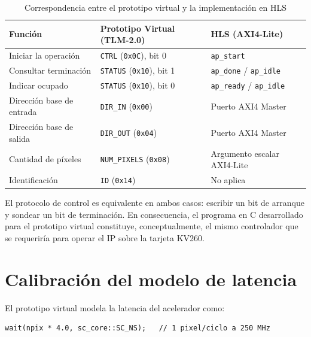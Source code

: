 \documentclass[11pt,letterpaper]{article}
\begin{document}
\begin{table}[H]
\centering
\caption{Correspondencia entre el prototipo virtual y la implementación en HLS}
\label{tab:correspondencia-registros}
\begin{tabular}{@{}p{4.2cm}p{4.6cm}p{5.2cm}@{}}
\toprule
\textbf{Función} & \textbf{Prototipo Virtual (TLM-2.0)} &
\textbf{HLS (AXI4-Lite)} \\
\midrule
Iniciar la operación      & \texttt{CTRL} (\texttt{0x0C}), bit 0 &
  \texttt{ap\_start} \\
Consultar terminación     & \texttt{STATUS} (\texttt{0x10}), bit 1 &
  \texttt{ap\_done} / \texttt{ap\_idle} \\
Indicar ocupado           & \texttt{STATUS} (\texttt{0x10}), bit 0 &
  \texttt{ap\_ready} / \texttt{ap\_idle} \\
Dirección base de entrada & \texttt{DIR\_IN} (\texttt{0x00}) &
  Puerto AXI4 Master \\
Dirección base de salida  & \texttt{DIR\_OUT} (\texttt{0x04}) &
  Puerto AXI4 Master \\
Cantidad de píxeles       & \texttt{NUM\_PIXELS} (\texttt{0x08}) &
  Argumento escalar AXI4-Lite \\
Identificación            & \texttt{ID} (\texttt{0x14}) & No aplica \\
\bottomrule
\end{tabular}
\end{table}

El protocolo de control es equivalente en ambos casos: escribir un bit de
arranque y sondear un bit de terminación. En consecuencia, el programa en C
desarrollado para el prototipo virtual constituye, conceptualmente, el mismo
controlador que se requeriría para operar el IP sobre la tarjeta KV260.

\section{Calibración del modelo de latencia}
\label{sec:latencia-cruzada}

El prototipo virtual modela la latencia del acelerador como:

\begin{lstlisting}[style=cppstyle]
wait(npix * 4.0, sc_core::SC_NS);   // 1 pixel/ciclo a 250 MHz
\end{lstlisting}
\end{document}
